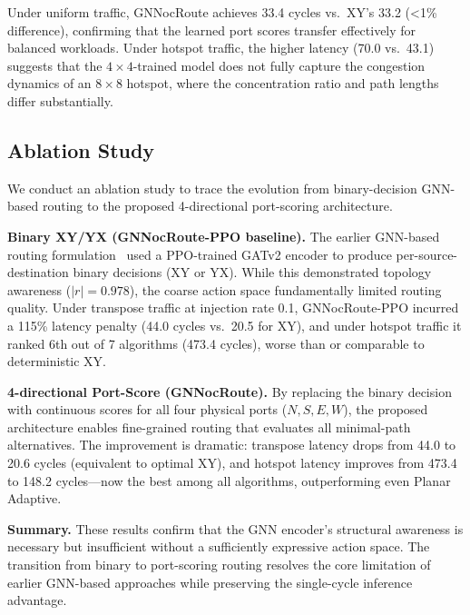 \begin{table}[h]
\centering
\caption{Zero-shot GNNocRoute on Mesh $8\times8$ at injection rate 0.01}
\label{tab:zero-shot-8x8}
\end{table}

Under uniform traffic, GNNocRoute achieves 33.4 cycles vs.~XY's 33.2 (\textless1\% difference), confirming that the learned port scores transfer effectively for balanced workloads. Under hotspot traffic, the higher latency (70.0 vs.~43.1) suggests that the $4\times4$-trained model does not fully capture the congestion dynamics of an $8\times8$ hotspot, where the concentration ratio and path lengths differ substantially.

\subsection{Ablation Study}

We conduct an ablation study to trace the evolution from binary-decision GNN-based routing to the proposed 4-directional port-scoring architecture.

\textbf{Binary XY/YX (GNNocRoute-PPO baseline).} The earlier GNN-based routing formulation~\cite{periodic2025} used a PPO-trained GATv2 encoder to produce per-source-destination binary decisions (XY or YX). While this demonstrated topology awareness ($|r|=0.978$), the coarse action space fundamentally limited routing quality. Under transpose traffic at injection rate 0.1, GNNocRoute-PPO incurred a 115\% latency penalty (44.0 cycles vs.~20.5 for XY), and under hotspot traffic it ranked 6th out of 7 algorithms (473.4 cycles), worse than or comparable to deterministic XY.

\textbf{4-directional Port-Score (GNNocRoute).} By replacing the binary decision with continuous scores for all four physical ports ($N,S,E,W$), the proposed architecture enables fine-grained routing that evaluates all minimal-path alternatives. The improvement is dramatic: transpose latency drops from 44.0 to 20.6 cycles (equivalent to optimal XY), and hotspot latency improves from 473.4 to 148.2 cycles---now the best among all algorithms, outperforming even Planar Adaptive.

\textbf{Summary.} These results confirm that the GNN encoder's structural awareness is necessary but insufficient without a sufficiently expressive action space. The transition from binary to port-scoring routing resolves the core limitation of earlier GNN-based approaches while preserving the single-cycle inference advantage.
